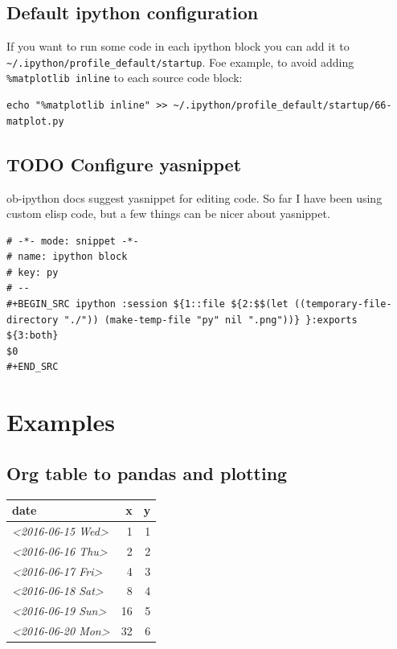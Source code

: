 \documentclass[11pt]{article}
\begin{document}
\subsection{Default ipython configuration}
\label{sec:orgheadline39}
If you want to run some code in each ipython block you can add it to \texttt{\textasciitilde{}/.ipython/profile\_default/startup}.
Foe example, to avoid adding \texttt{\%matplotlib inline} to each source code block:
\begin{verbatim}
echo "%matplotlib inline" >> ~/.ipython/profile_default/startup/66-matplot.py
\end{verbatim}
\subsection{{\bfseries\sffamily TODO} Configure yasnippet}
\label{sec:orgheadline40}
ob-ipython docs suggest yasnippet for editing code.
So far I have been using custom elisp code, but a few things can be nicer about yasnippet.

\begin{verbatim}
# -*- mode: snippet -*-
# name: ipython block
# key: py
# --
#+BEGIN_SRC ipython :session ${1::file ${2:$$(let ((temporary-file-directory "./")) (make-temp-file "py" nil ".png"))} }:exports ${3:both}
$0
#+END_SRC
\end{verbatim}
\section{Examples}
\label{sec:orgheadline6}
\subsection{Org table to pandas and plotting}
\label{sec:orgheadline42}
\begin{center}
\label{tab:orgtable1}
\begin{tabular}{lrr}
\hline
date & x & y\\
\hline
\textit{<2016-06-15 Wed>} & 1 & 1\\
\textit{<2016-06-16 Thu>} & 2 & 2\\
\textit{<2016-06-17 Fri>} & 4 & 3\\
\textit{<2016-06-18 Sat>} & 8 & 4\\
\textit{<2016-06-19 Sun>} & 16 & 5\\
\textit{<2016-06-20 Mon>} & 32 & 6\\
\hline
\end{tabular}
\end{center}
\end{document}
